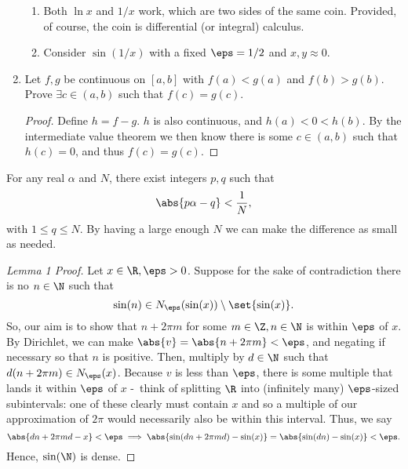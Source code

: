 \documentclass{article}
\begin{document}
\begin{enumerate}
\begin{enumerate}
          \item Both $\ln x$ and $1/x$ work, which are two sides of the same coin. Provided, of course, the coin is differential (or integral) calculus.

          \item Consider $\sin(1/x)$ with a fixed $\eps = 1/2$ and $x, y \approx 0$.

        \end{enumerate}

  \item Let $f, g$ be continuous on $[a, b]$ with $f(a) < g(a)$ and $f(b) > g(b)$. Prove $\exists c \in (a, b)$ such that $f(c) = g(c)$.

        \begin{proof}
          Define $h = f - g$. $h$ is also continuous, and $h(a) < 0 < h(b)$.
          By the intermediate value theorem we then know there is some $c \in (a, b)$ such that $h(c) = 0$, and thus $f(c) = g(c)$.
        \end{proof}
\end{enumerate}
\pagebreak

\begin{theorem}
  For any real $\alpha$ and $N$, there exist integers $p, q$ such that
  \[ \abs{p\alpha - q} < \frac{1}{N}, \]
  with $1 \le q \le N$. By having a large enough $N$ we can make the difference as small as needed.
\end{theorem}

\begin{proof}[Lemma 1 Proof]
  Let $x \in \R, \eps > 0$. Suppose for the sake of contradiction there is no $n \in \N$ such that
  \[ \sin(n) \in N_{\eps}(\sin(x)) \setminus \set{\sin(x)}. \]
  So, our aim is to show that $n + 2\pi m$ for some $m \in \Z, n \in \N$ is within $\eps$ of $x$.
  By Dirichlet, we can make $\abs{v} = \abs{n + 2\pi m} < \eps$, and negating if necessary so that $n$ is positive.
  Then, multiply by $d \in \N$ such that $d(n + 2\pi m) \in N_{\eps}(x)$. Because $v$ is less than $\eps$, there is some multiple
  that lands it within $\eps$ of $x$ -\ think of splitting $\R$ into (infinitely many) $\eps$-sized subintervals:
  one of these clearly must contain $x$ and so a multiple of our approximation of $2\pi$ would necessarily also be within this interval.
  Thus, we say
  \[ \abs{dn + 2\pi m d - x} < \eps \implies \abs{\sin(dn + 2\pi m d) - \sin(x)} = \abs{\sin(dn) - \sin(x)} < \eps. \]
  Hence, $\sin(\N)$ is dense.
\end{proof}
\end{document}
